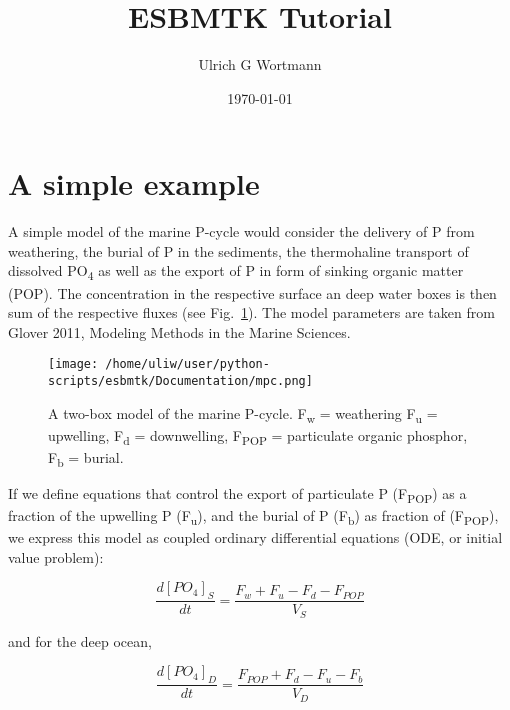 \documentclass[11pt]{article}
\author{Ulrich G Wortmann}
\date{\today}
\title{ESBMTK Tutorial}
\begin{document}
\maketitle

\tableofcontents
\section{A simple example}
\label{sec:org2a1169a}

A simple model of the marine P-cycle would consider the delivery of P from weathering, the burial of P in the sediments, the thermohaline transport of dissolved PO\textsubscript{4} as well as the export of P in form of sinking organic matter (POP). The concentration in the respective surface an deep water boxes is then sum of the respective fluxes (see Fig.~\ref{pcycle}). The model parameters are taken from Glover 2011, Modeling Methods in the Marine Sciences.
\begin{figure}[htbp]
\centering
\texttt{[image: /home/uliw/user/python-scripts/esbmtk/Documentation/mpc.png]}
\caption{\label{pcycle}A two-box model of the marine P-cycle. F\textsubscript{w} = weathering F\textsubscript{u} = upwelling, F\textsubscript{d} = downwelling, F\textsubscript{POP} = particulate organic phosphor, F\textsubscript{b} = burial.}
\end{figure}

If we define equations that control the export of particulate P (F\textsubscript{POP}) as a fraction of the upwelling P (F\textsubscript{u}), and the burial of P (F\textsubscript{b}) as fraction of (F\textsubscript{POP}), we express this model as coupled ordinary differential equations (ODE, or initial value problem):

\begin{equation}\label{}
\frac{d[PO_{4}]_{S}}{dt} = \frac{F_w + F_u - F_d - F_{POP}}{V_S}
\end{equation}

and for the deep ocean, 

\begin{equation}\label{}
\frac{d[PO_{4}]_{D}}{dt}= \frac{F_{POP} + F_d - F_u - F_b}{V_D}
\end{equation}
\end{document}
